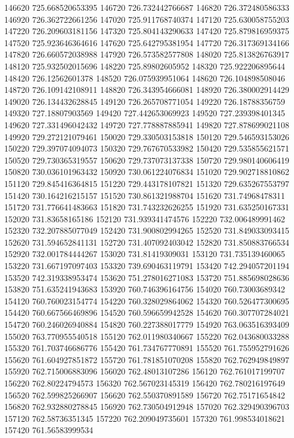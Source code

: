 {146620 725.668520653395
146720 726.732442766687
146820 726.372480586333
146920 726.362722661256
147020 725.911768740374
147120 725.630058755203
147220 726.209603181156
147320 725.804143290633
147420 725.879816959375
147520 725.923646364616
147620 725.642795381954
147720 726.317369134166
147820 726.660572038988
147920 726.573582577808
148020 725.813826763917
148120 725.932502015696
148220 725.89802605952
148320 725.922206895644
148420 726.12562601378
148520 726.075939951064
148620 726.104898508046
148720 726.109142108911
148820 726.343954666081
148920 726.380002914429
149020 726.134432628845
149120 726.265708771054
149220 726.18788356759
149320 727.18807903569
149420 727.442653069923
149520 727.239398401345
149620 727.331496042432
149720 727.778887885941
149820 727.878699021108
149920 729.272121079461
150020 729.330503153818
150120 729.546593153026
150220 729.397074094073
150320 729.767670533982
150420 729.535855621571
150520 729.730365319557
150620 729.737073137338
150720 729.980140606419
150820 730.036101963432
150920 730.061224076834
151020 729.902718810862
151120 729.845416364815
151220 729.443178107821
151320 729.635267553797
151420 730.164216215157
151520 730.861321988704
151620 731.74968478311
151720 731.776641483663
151820 731.743232626255
151920 731.635250167331
152020 731.83658165186
152120 731.939341474576
152220 732.006489991462
152320 732.207885077049
152420 731.900802994265
152520 731.849033093415
152620 731.594652841131
152720 731.407092403042
152820 731.850883766534
152920 732.001784444267
153020 731.81419309031
153120 731.735139460065
153220 731.667197097403
153320 739.690463119791
153420 742.294057201194
153520 742.319338953474
153620 751.278016271083
153720 751.885698028636
153820 751.635241943683
153920 760.746396164756
154020 760.73003689342
154120 760.760023154774
154220 760.328029864062
154320 760.526477300695
154420 760.667566469896
154520 760.596659942528
154620 760.307707284021
154720 760.246026940884
154820 760.227388017779
154920 763.063516393409
155020 763.770955540518
155120 762.011980340667
155220 762.043680033288
155320 761.703746686776
155420 761.734767770891
155520 761.755952791626
155620 761.604927851872
155720 761.781851070208
155820 762.762949849897
155920 762.715006883096
156020 762.48013107286
156120 762.761017199707
156220 762.80224794573
156320 762.567023145319
156420 762.780216197649
156520 762.599825266907
156620 762.550370891589
156720 762.75171654842
156820 762.932880278845
156920 762.730504912948
157020 762.329490396703
157120 762.58736351345
157220 762.209049735601
157320 761.998534018621
157420 761.56583999534
}
